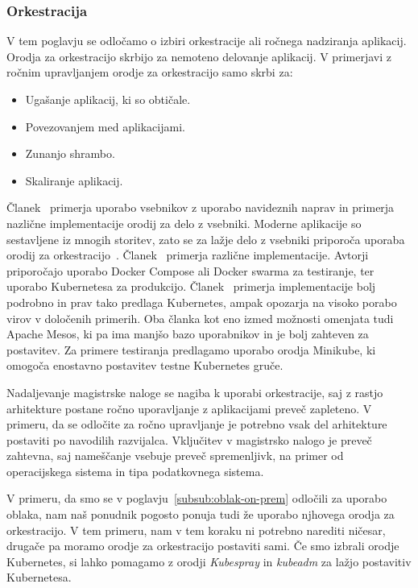 \subsubsection{Orkestracija}

V tem poglavju se odločamo o izbiri orkestracije ali
ročnega nadziranja aplikacij.
Orodja za orkestracijo skrbijo za nemoteno delovanje aplikacij.
V primerjavi z ročnim upravljanjem orodje za orkestracijo samo skrbi za:
\begin{itemize}
    \item Ugašanje aplikacij, ki so obtičale.
    \item Povezovanjem med aplikacijami.
    \item Zunanjo shrambo.
    \item Skaliranje aplikacij.
\end{itemize}

\noindent Članek~\cite{virtualisation_vs_containerization} primerja uporabo
vsebnikov z uporabo navideznih naprav in primerja
nazlične implementacije orodij za delo z vsebniki.
Moderne aplikacije so sestavljene iz mnogih storitev, zato se za
lažje delo z vsebniki priporoča uporaba orodij za orkestracijo~\cite{container_orchestration}.
Članek~\cite{container_orchestrators_comparison} primerja različne implementacije.
Avtorji priporočajo uporabo Docker Compose ali Docker swarma za testiranje,
ter uporabo Kubernetesa za produkcijo.
Članek~\cite{container_orchestration} primerja implementacije bolj podrobno in
prav tako predlaga Kubernetes,
ampak opozarja na visoko porabo virov v določenih primerih.
Oba članka kot eno izmed možnosti omenjata tudi Apache Mesos,
ki pa ima manjšo bazo uporabnikov in je bolj zahteven za postavitev.
Za primere testiranja predlagamo uporabo orodja Minikube,
ki omogoča enostavno postavitev testne Kubernetes gruče.

Nadaljevanje magistrske naloge se nagiba k uporabi orkestracije,
saj z rastjo arhitekture postane ročno uporavljanje z aplikacijami preveč
zapleteno.
V primeru, da se odločite za ročno upravljanje je potrebno vsak del
arhitekture postaviti po navodilih razvijalca.
Vključitev v magistrsko nalogo je preveč zahtevna,
saj nameščanje vsebuje preveč spremenljivk, na primer 
od operacijskega sistema in tipa podatkovnega sistema.

V primeru, da smo se v poglavju~\ref{subsub:oblak-on-prem} odločili za uporabo oblaka,
nam naš ponudnik pogosto ponuja tudi že uporabo njhovega
orodja za orkestracijo.
V tem primeru, nam v tem koraku ni potrebno narediti ničesar,
drugače pa moramo orodje za orkestracijo postaviti sami.
Če smo izbrali orodje Kubernetes, si lahko pomagamo z orodji \textit{Kubespray} in \textit{kubeadm}
za lažjo postavitiv Kubernetesa.